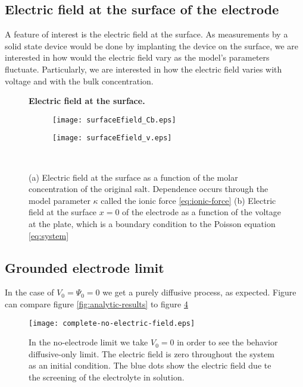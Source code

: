 \newpage
\subsection{Electric field at the surface of the electrode}

A feature of interest is the electric field at the surface. As measurements by a solid state device would be done by implanting the device on the surface, we are interested in how would the electric field vary as the model's parameters fluctuate. Particularly, we are interested in how the electric field varies with voltage and with the bulk concentration.

\begin{figure}[htbp]
\centering
\textbf{Electric field at the surface.}\par\medskip
\begin{subfigure}{.5\linewidth}
\centering
\texttt{[image: surfaceEfield\_Cb.eps]}
\caption{}
\label{fig:ef1}
\end{subfigure}%
\begin{subfigure}{.5\linewidth}
\centering
\texttt{[image: surfaceEfield\_v.eps]}
\caption{}
\label{fig:ef2}
\end{subfigure}\\[1ex]
\caption{(a) Electric field at the surface as a function of the molar concentration of the original salt. Dependence occurs through the model parameter $\kappa$ called the ionic force \ref{eq:ionic-force} (b) Electric field at the surface $x=0$ of the electrode as a function of the voltage at the plate, which is a boundary condition to the Poisson equation \ref{eq:system}}
\label{fig:test}
\end{figure}




\newpage
\subsection{Grounded electrode limit}

In the case of $V_0 = \Psi_0 = 0$ we get a purely diffusive process, as expected. Figure can compare figure \ref{fig:analytic-results} to figure \ref{fig:nernts-no-field}


\begin{figure}[htbp]
\centering
\texttt{[image: complete-no-electric-field.eps]}
\caption{In the no-electrode limit we take $V_0=0$ in order to see the behavior diffusive-only limit. The electric field is zero throughout the system as an initial condition. The blue dots show the electric field due te the screening of the electrolyte in solution. }
\label{fig:nernts-no-field}
\end{figure}


